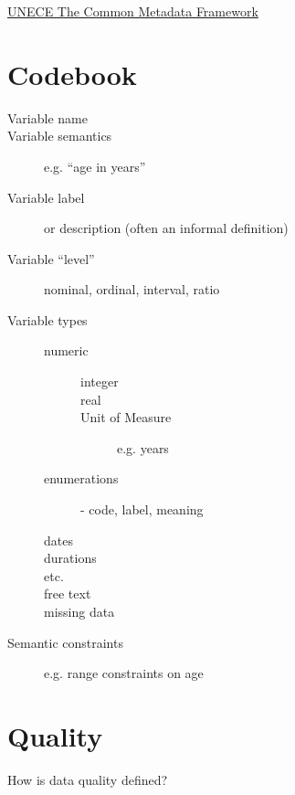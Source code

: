 \href{http://www1.unece.org/stat/platform/display/metis/The+Common+Metadata+Framework}{UNECE The Common Metadata Framework}

\chapter{Codebook}

\begin{description}
  \item [Variable name]
  \item [Variable semantics] e.g. ``age in years''
  \item [Variable label] or description  (often an informal definition)
    \item [Variable ``level''] nominal, ordinal, interval, ratio
  \item [Variable types]
    \begin{description}
    \item [numeric]
      \begin{description}
      \item [integer]
      \item [real]
      \item [Unit of Measure] e.g. years
      \end{description}
    \item [enumerations] - code, label, meaning
    \item [dates]
    \item [durations]
    \item [etc.]
    \item [free text]
    \item [missing data]
    \end{description}
  \item [Semantic constraints] e.g. range constraints on age
\end{description}

\chapter{Quality}

How is data quality defined?

